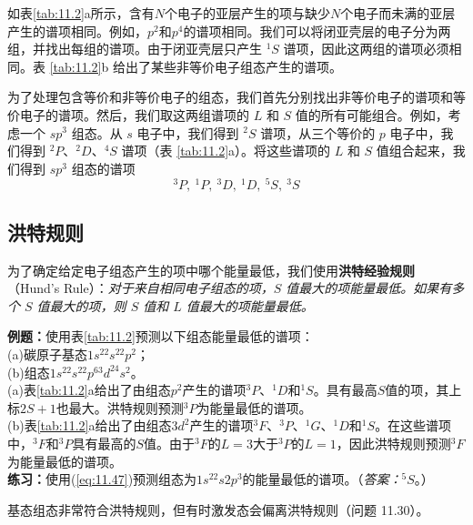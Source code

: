     如表\ref{tab:11.2}a所示，含有$N$个电子的亚层产生的项与缺少$N$个电子而未满的亚层产生的谱项相同。例如，$p^2$和$p^4$的谱项相同。我们可以将闭亚壳层的电子分为两组，并找出每组的谱项。由于闭亚壳层只产生 $^1S$ 谱项，因此这两组的谱项必须相同。表 \ref{tab:11.2}b 给出了某些非等价电子组态产生的谱项。

    为了处理包含等价和非等价电子的组态，我们首先分别找出非等价电子的谱项和等价电子的谱项。然后，我们取这两组谱项的 $L$ 和 $S$ 值的所有可能组合。例如，考虑一个 $sp^3$ 组态。从 $s$ 电子中，我们得到 $^2S$ 谱项，从三个等价的 $p$ 电子中，我们得到 $^2P$、$^2D$、$^4S$ 谱项（表 \ref{tab:11.2}a）。将这些谱项的 $L$ 和 $S$ 值组合起来，我们得到 $sp^3$ 组态的谱项
    \begin{equation}
        ^3P,\: ^1P,\: ^3D,\: ^1D,\: ^5S,\: ^3S
        \label{eq:11.47}
    \end{equation}

\subsection*{洪特规则}

    为了确定给定电子组态产生的项中哪个能量最低，我们使用\textbf{洪特经验规则}（Hund's Rule）：\textit{对于来自相同电子组态的项，$S$ 值最大的项能量最低。如果有多个 $S$ 值最大的项，则 $S$ 值和 $L$ 值最大的项能量最低。}

    \begin{examplebox}
        \textbf{例题：}使用表\ref{tab:11.2}预测以下组态能量最低的谱项：\\
        (a)碳原子基态$1s^22s^22p^2$；\\
        (b)组态$1s^22s^22p^63d^24s^2$。
        \\

        (a)表\ref{tab:11.2}a给出了由组态$p^2$产生的谱项$^3P$、$^1D$和$^1S$。具有最高$S$值的项，其上标$2S+1$也最大。洪特规则预测$^3P$为能量最低的谱项。\\
        (b)表\ref{tab:11.2}a给出了由组态$3d^2$产生的谱项$^3F$、$^3P$、$^1G$、$^1D$和$^1S$。在这些谱项中，$^3F$和$^3P$具有最高的$S$值。由于$^3F$的$L=3$大于$^3P$的$L=1$，因此洪特规则预测$^3F$为能量最低的谱项。
        \\

        \textbf{练习：}使用(\ref{eq:11.47})预测组态为$1s^22s2p^3$的能量最低的谱项。（\textit{答案：}$^5S$。）
    \end{examplebox}

    基态组态非常符合洪特规则，但有时激发态会偏离洪特规则（问题 11.30）。

